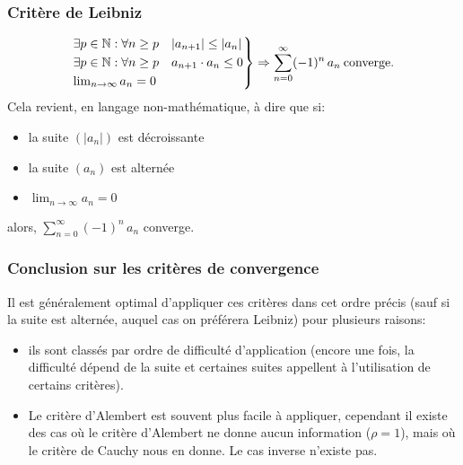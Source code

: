 \documentclass{article}
\begin{document}
\subsubsection{Critère de Leibniz}
\begin{equation*}
	\begin{rcases} %
		\exists p \in \mathbb{N} : \forall n \geq p \quad |a_{n+1}| \leq |a_n| \\
		\exists p \in \mathbb{N} : \forall n \geq p \quad a_{n+1} \cdot a_n \leq 0 \\
		\lim_{n \to \infty} a_n = 0
	\end{rcases}
	\Rightarrow \sum_{n=0}^\infty (-1)^n \, a_n \: \text{converge.}
\end{equation*}
Cela revient, en langage non-mathématique, à dire que si:
\begin{itemize}
	\item la suite \( (|a_n|) \) est décroissante
	\item la suite \( (a_n) \) est alternée
	\item \( \lim_{n \to \infty} a_n = 0 \)
\end{itemize}
alors, \(\sum_{n=0}^\infty (-1)^n \, a_n\) converge.

\subsubsection{Conclusion sur les critères de convergence}
Il est généralement optimal d'appliquer ces critères dans cet ordre précis (sauf si la suite est alternée, auquel cas on préférera Leibniz) pour plusieurs raisons:
\begin{itemize}
	\item ils sont classés par ordre de difficulté d'application (encore une fois, la difficulté dépend de la suite et certaines suites appellent à l'utilisation de certains critères). %
	\item Le critère d'Alembert est souvent plus facile à appliquer, cependant il existe des cas où le critère d'Alembert ne donne aucun information (\(\rho = 1\)), mais où le critère de Cauchy nous en donne. Le cas inverse n'existe pas.
\end{itemize}

 
\end{document}
